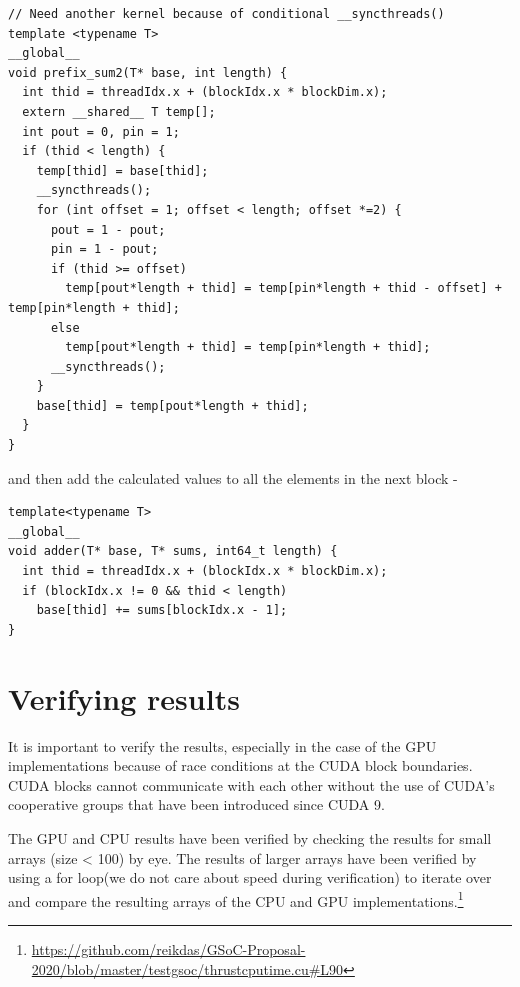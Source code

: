 \documentclass{article}
\begin{document}
\begin{mdframed}[backgroundcolor=light-gray, roundcorner=10pt,leftmargin=0.5, rightmargin=0.5, innertopmargin=5,innerbottommargin=5, outerlinewidth=1, linecolor=light-gray]
\begin{verbatim}
// Need another kernel because of conditional __syncthreads()
template <typename T>
__global__
void prefix_sum2(T* base, int length) {
  int thid = threadIdx.x + (blockIdx.x * blockDim.x);
  extern __shared__ T temp[];
  int pout = 0, pin = 1;
  if (thid < length) {
    temp[thid] = base[thid];
    __syncthreads();
    for (int offset = 1; offset < length; offset *=2) {
      pout = 1 - pout;
      pin = 1 - pout;
      if (thid >= offset)
        temp[pout*length + thid] = temp[pin*length + thid - offset] + temp[pin*length + thid];
      else
        temp[pout*length + thid] = temp[pin*length + thid];
      __syncthreads();
    }
    base[thid] = temp[pout*length + thid];
  }
}
\end{verbatim}
\end{mdframed}

and then add the calculated values to all the elements in the next block - 

\begin{mdframed}[backgroundcolor=light-gray, roundcorner=10pt,leftmargin=0.5, rightmargin=0.5, innertopmargin=5,innerbottommargin=5, outerlinewidth=1, linecolor=light-gray]
\begin{verbatim}
template<typename T>
__global__
void adder(T* base, T* sums, int64_t length) {
  int thid = threadIdx.x + (blockIdx.x * blockDim.x);
  if (blockIdx.x != 0 && thid < length)
    base[thid] += sums[blockIdx.x - 1];
}
\end{verbatim}
\end{mdframed}

\section{Verifying results}
It is important to verify the results, especially in the case of the GPU implementations because of race conditions at the CUDA block boundaries. CUDA blocks cannot communicate with each other without the use of CUDA's cooperative groups that have been introduced since CUDA 9.\par
The GPU and CPU results have been verified by checking the results for small arrays (size < 100) by eye. The results of larger arrays have been verified by using a for loop(we do not care about speed during verification) to iterate over and compare the resulting arrays of the CPU and GPU implementations.\footnote{\url{https://github.com/reikdas/GSoC-Proposal-2020/blob/master/testgsoc/thrustcputime.cu#L90}}
\end{document}
